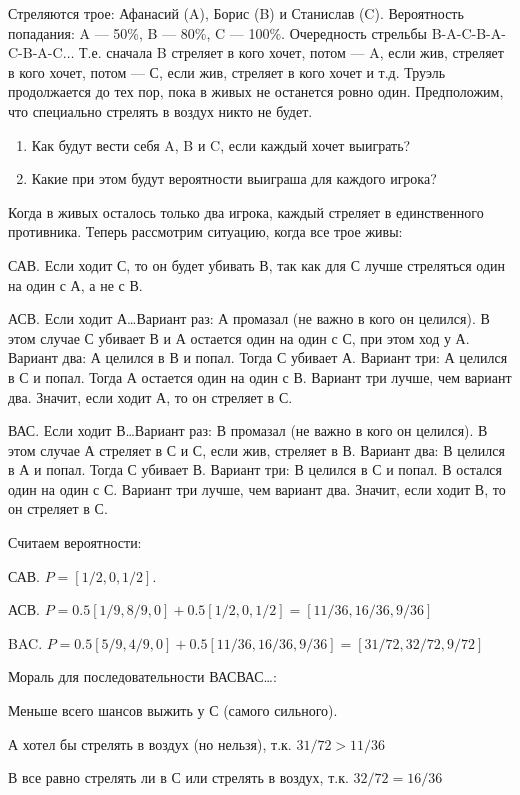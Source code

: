 \begin{problem}
Стреляются трое: Афанасий (A), Борис (B) и Станислав (C). Вероятность попадания: A — 50\%, B — 80\%, C — 100\%. Очередность стрельбы B-A-C-B-A-C-B-A-C$\ldots$ Т.е. сначала B стреляет в кого хочет, потом — A, если жив, стреляет в кого хочет, потом — С, если жив, стреляет в кого хочет и т.д. Труэль продолжается до тех пор, пока в живых не останется ровно один. Предположим, что специально стрелять в воздух никто не будет.

\begin{enumerate}
\item Как будут вести себя A, B и C, если каждый хочет выиграть?

\item Какие при этом будут вероятности выиграша для каждого игрока?
\end{enumerate}
\begin{sol}
Когда в живых осталось только два игрока, каждый стреляет в единственного противника. Теперь рассмотрим ситуацию, когда все трое живы:

САВ. Если ходит С, то он будет убивать В, так как для С лучше стреляться один на один с А, а не с В.

АСВ. Если ходит А\ldots Вариант раз: А промазал (не важно в кого он целился). В этом случае С убивает В и А остается один на один с С, при этом ход у А.  Вариант два: А целился в В и попал. Тогда С убивает А. Вариант три: А целился в С и попал. Тогда А остается один на один с В. Вариант три лучше, чем вариант два. Значит, если ходит А, то он стреляет в С.

ВАС. Если ходит В\ldots Вариант раз: В промазал (не важно в кого он целился). В этом случае А стреляет в С и С, если жив, стреляет в В. Вариант два: В целился в А и попал. Тогда С убивает В. Вариант три: В целился в С и попал. В остался один на один с С. Вариант три лучше, чем вариант два. Значит, если ходит В, то он стреляет в С.

Считаем вероятности:

САВ. $P=[1/2,0,1/2]$.

АСВ. $P=0.5[1/9,8/9,0]+0.5[1/2,0,1/2]=[11/36,16/36,9/36]$

BAC. $P=0.5[5/9,4/9,0]+0.5[11/36,16/36,9/36]=[31/72,32/72,9/72]$

Мораль для последовательности ВАСВАС\ldots :

Меньше всего шансов выжить у С (самого сильного).

А хотел бы стрелять в воздух (но нельзя), т.к. $31/72>11/36$

В все равно стрелять ли в С или стрелять в воздух, т.к. $32/72=16/36$
\end{sol}
\end{problem}






